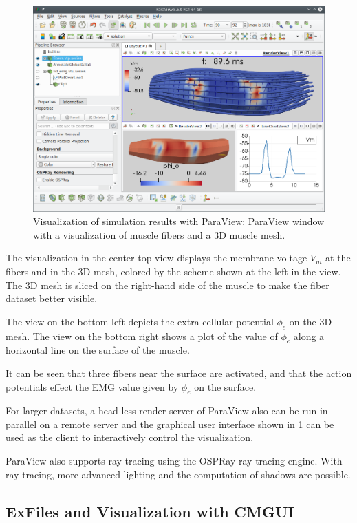 \begin{figure}%
  \centering%
  \includegraphics[width=\textwidth]{images/implementation/paraview.png}%
  \caption{Visualization of simulation results with ParaView: ParaView window with a visualization of muscle fibers and a 3D muscle mesh.}%
  \label{fig:paraview_output}%
\end{figure}%

The visualization in the center top view displays the membrane voltage $V_m$ at the fibers and in the 3D mesh, colored by the scheme shown at the left in the view. The 3D mesh is sliced on the right-hand side of the muscle to make the fiber dataset better visible.

The view on the bottom left depicts the extra-cellular potential $\phi_e$ on the 3D mesh. The view on the bottom right shows a plot of the value of $\phi_e$ along a horizontal line on the surface of the muscle.

It can be seen that three fibers near the surface are activated, and that the action potentials effect the EMG value given by $\phi_e$ on the surface.

For larger datasets, a head-less render server of ParaView also can be run in parallel on a remote server and the graphical user interface shown in \cref{fig:paraview_output} can be used as the client to interactively control the visualization.

ParaView also supports ray tracing using the OSPRay ray tracing engine. With ray tracing, more advanced lighting and the computation of shadows are possible.

\subsection{ExFiles and Visualization with CMGUI}

